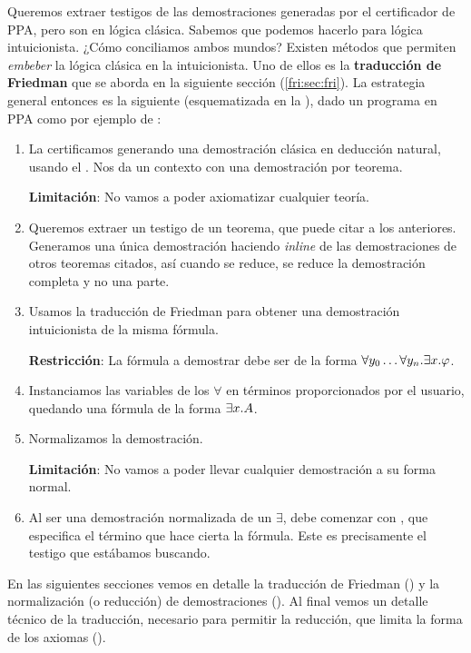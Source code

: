Queremos extraer testigos de las demostraciones generadas por el certificador de
PPA, pero son en lógica clásica. Sabemos que podemos hacerlo para lógica
intuicionista. ¿Cómo conciliamos ambos mundos? Existen métodos que permiten
\textit{embeber} la lógica clásica en la intuicionista. Uno de ellos es la
\textbf{traducción de Friedman} que se aborda en la siguiente sección (\ref{fri:sec:fri}). La
estrategia general entonces es la siguiente (esquematizada en la ), dado un programa en PPA como
por ejemplo de :
\begin{enumerate}
    \item La certificamos generando una demostración clásica en deducción
          natural, usando el \modCertifier{}. Nos da un contexto con una demostración
          por teorema.

          \textbf{Limitación}: No vamos a poder axiomatizar cualquier teoría.
    \item Queremos extraer un testigo de un teorema, que puede citar a los anteriores. Generamos una única demostración haciendo \textit{inline} de las demostraciones de otros teoremas citados, así cuando se reduce, se reduce la demostración completa y no una parte.
    \item Usamos la traducción de Friedman para obtener una demostración
          intuicionista de la misma fórmula.

          \textbf{Restricción}: La fórmula a demostrar debe ser de la forma
          $\forall y_0 \dots \forall y_n . \exists x . \varphi$.
    \item Instanciamos las variables de los $\forall$ en términos proporcionados
          por el usuario, quedando una fórmula de la forma $\exists x . A$.
    \item Normalizamos la demostración.

          \textbf{Limitación}: No vamos a poder llevar cualquier demostración a
          su forma normal.

    \item Al ser una demostración normalizada de un $\exists$, debe comenzar con
          , que especifica el término que hace cierta la fórmula. Este
          es precisamente el testigo que estábamos buscando.
          \proofTreeExistsI
\end{enumerate}

En las siguientes secciones vemos en detalle la traducción de Friedman
() y la normalización (o reducción) de demostraciones (). Al final vemos un detalle técnico de la traducción, necesario para permitir la reducción, que limita la forma de los axiomas ().


